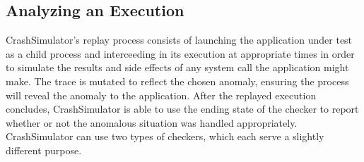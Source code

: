 

\subsection{Analyzing an Execution}

CrashSimulator's replay process consists of launching the application under
test as a child process and interceeding in its execution at appropriate
times in order to simulate the results and side effects of any system call
the application might make.  The trace is mutated to reflect the chosen
anomaly, ensuring the process will reveal the anomaly to the application.
After the replayed execution concludes, CrashSimulator is able to use the
ending state of the checker to report whether or not the anomalous
situation was handled appropriately.  CrashSimulator can use two types of
checkers, which each serve a slightly different purpose.



